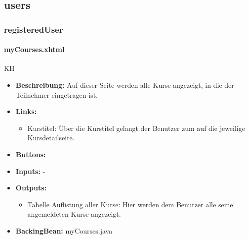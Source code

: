 		\subsection{users}
		
			\subsubsection{registeredUser}
				
				\paragraph{myCourses.xhtml}
					KH\\
					\begin{itemize}
						\item \textbf{Beschreibung:} Auf dieser Seite werden alle Kurse angezeigt, in die der Teilnehmer eingetragen ist.
						\item \textbf{Links:}
							\begin{itemize}
								\item Kurstitel: Über die Kurstitel gelangt der Benutzer zum auf die jeweilige Kursdetailseite.
							\end{itemize}
						\item \textbf{Buttons:}
						\item \textbf{Inputs:} -
						\item \textbf{Outputs:}
							\begin{itemize}
								\item Tabelle Auflistung aller Kurse: Hier werden dem Benutzer alle seine angemeldeten Kurse angezeigt.
							\end{itemize}
						\item \textbf{BackingBean:} myCourses.java
					\end{itemize}
				
